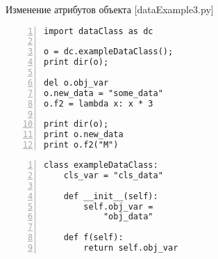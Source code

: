 \documentclass[hyperref={pdftex,unicode}]{beamer}
\begin{document}
\begin{frame}[fragile]{Изменение атрибутов объекта [dataExample3.py]}
\begin{minipage}{0.6\linewidth}
    \begin{lstlisting}[numbers=left,basicstyle=\scriptsize\ttfamily]
import dataClass as dc                                                                          
                                                                                                
o = dc.exampleDataClass();                                                                      
print dir(o);                                                                                   
                                                                                                
del o.obj_var                                                                                   
o.new_data = "some_data"                                                                        
o.f2 = lambda x: x * 3                                                                          
                                                                                                
print dir(o);                                                                                   
print o.new_data                                                                                
print o.f2("M")
    \end{lstlisting}
\end{minipage}
\hfill
\begin{minipage}{0.35\linewidth}
    \begin{lstlisting}[numbers=left,basicstyle=\tiny\ttfamily,numbers=none]
class exampleDataClass:                                                                                                      
    cls_var = "cls_data"                                                                        

    def __init__(self):                                                                         
        self.obj_var =
            "obj_data"   
                                                            
    def f(self):                                                                                
        return self.obj_var
    \end{lstlisting}
\end{minipage}
\end{frame}
\end{document}
